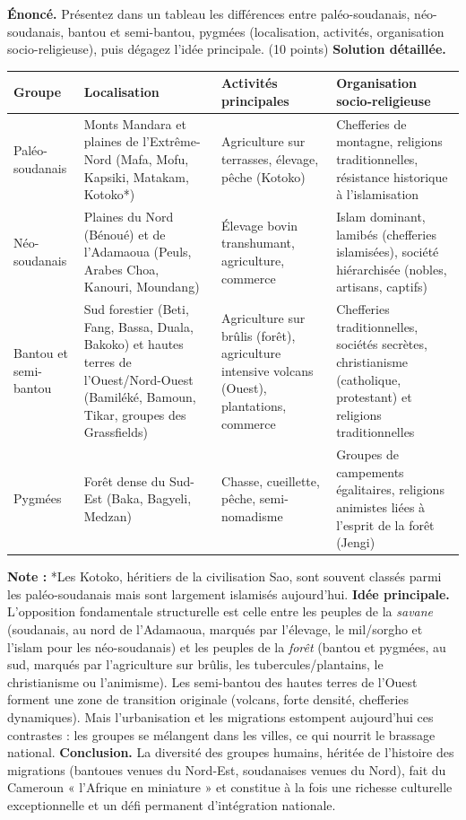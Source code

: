 \documentclass[11pt]{article}
\begin{document}
\begin{exoresolu}
\textbf{Énoncé.} Présentez dans un tableau les différences entre paléo-soudanais, néo-soudanais, bantou et semi-bantou, pygmées (localisation, activités, organisation socio-religieuse), puis dégagez l'idée principale. (10 points)
\tcblower
\textbf{Solution détaillée.}
\begin{center}
\begin{tabularx}{\linewidth}{|l|X|X|X|}
\hline
\rowcolor{popblueL} \textbf{Groupe} & \textbf{Localisation} & \textbf{Activités principales} & \textbf{Organisation socio-religieuse} \\
\hline
Paléo-soudanais & Monts Mandara et plaines de l'Extrême-Nord (Mafa, Mofu, Kapsiki, Matakam, Kotoko*) & Agriculture sur terrasses, élevage, pêche (Kotoko) & Chefferies de montagne, religions traditionnelles, résistance historique à l'islamisation \\
\hline
Néo-soudanais & Plaines du Nord (Bénoué) et de l'Adamaoua (Peuls, Arabes Choa, Kanouri, Moundang) & Élevage bovin transhumant, agriculture, commerce & Islam dominant, lamibés (chefferies islamisées), société hiérarchisée (nobles, artisans, captifs) \\
\hline
Bantou et semi-bantou & Sud forestier (Beti, Fang, Bassa, Duala, Bakoko) et hautes terres de l'Ouest/Nord-Ouest (Bamiléké, Bamoun, Tikar, groupes des Grassfields) & Agriculture sur brûlis (forêt), agriculture intensive volcans (Ouest), plantations, commerce & Chefferies traditionnelles, sociétés secrètes, christianisme (catholique, protestant) et religions traditionnelles \\
\hline
Pygmées & Forêt dense du Sud-Est (Baka, Bagyeli, Medzan) & Chasse, cueillette, pêche, semi-nomadisme & Groupes de campements égalitaires, religions animistes liées à l'esprit de la forêt (Jengi) \\
\hline
\end{tabularx}
\end{center}
\textbf{Note :} *Les Kotoko, héritiers de la civilisation Sao, sont souvent classés parmi les paléo-soudanais mais sont largement islamisés aujourd'hui.
\textbf{Idée principale.} L'opposition fondamentale structurelle est celle entre les peuples de la \emph{savane} (soudanais, au nord de l'Adamaoua, marqués par l'élevage, le mil/sorgho et l'islam pour les néo-soudanais) et les peuples de la \emph{forêt} (bantou et pygmées, au sud, marqués par l'agriculture sur brûlis, les tubercules/plantains, le christianisme ou l'animisme). Les semi-bantou des hautes terres de l'Ouest forment une zone de transition originale (volcans, forte densité, chefferies dynamiques). Mais l'urbanisation et les migrations estompent aujourd'hui ces contrastes : les groupes se mélangent dans les villes, ce qui nourrit le brassage national.
\textbf{Conclusion.} La diversité des groupes humains, héritée de l'histoire des migrations (bantoues venues du Nord-Est, soudanaises venues du Nord), fait du Cameroun « l'Afrique en miniature » et constitue à la fois une richesse culturelle exceptionnelle et un défi permanent d'intégration nationale.
\end{exoresolu}
\end{document}
